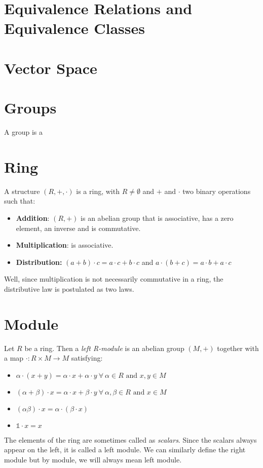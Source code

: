 \begin{appendices}
    \section{Equivalence Relations and Equivalence Classes}
    \section{Vector Space}
\section{Groups}
A group is a 
\section{Ring}
A structure $(R,+, \cdot)$ is a ring, with $R\neq \emptyset$ and $+$ and $\cdot$ two binary operations such that:
\begin{itemize}
    \item \textbf{Addition}: $(R,+)$ is an abelian group that is associative, has a zero element, an inverse and is commutative. 
    \item \textbf{Multiplication}: is associative.
    \item \textbf{Distribution: } $(a+b)\cdot c = a\cdot c + b\cdot c$ and $a\cdot (b+c) = a\cdot b + a\cdot c$
\end{itemize}
Well, since multiplication is not necessarily commutative in a ring, the distributive law is postulated as two laws.
\section{Module}
Let $R$ be a ring. Then a \textit{left R-module} is an abelian group $(M,+)$ together with a map $\cdot : R\times M \rightarrow M$ satisfying:
\begin{itemize}
    \item $\alpha \cdot (x+y) = \alpha \cdot x + \alpha \cdot y \ \forall \ \alpha \in R \text{ and } x,y\in M$
    \item $(\alpha+\beta)\cdot x = \alpha\cdot x + \beta\cdot y\ \forall \ \alpha,\beta \in R \text{ and } x\in M$
    \item $(\alpha \beta)\cdot x = \alpha \cdot (\beta \cdot x)$
    \item $\mathds{1}\cdot x = x$
\end{itemize}
The elements of the ring are sometimes called as \textit{scalars}. Since the scalars always appear on the left, it is called a left module. We can similarly define the right module but by module, we will always mean left module.

\end{appendices}
